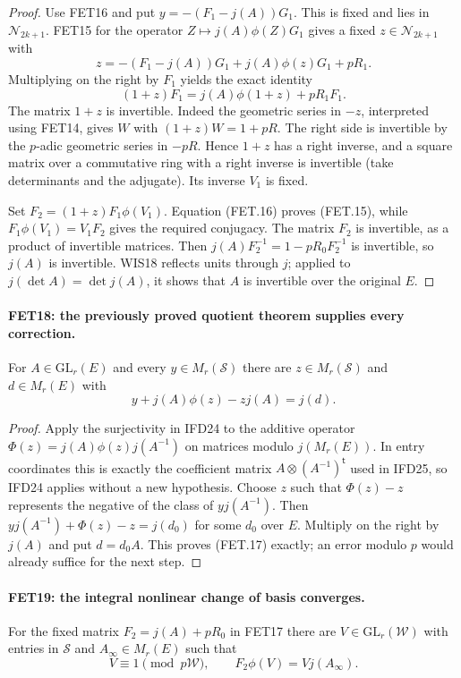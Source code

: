 \begin{proof}
Use FET16 and put $y=-(F_1-j(A))G_1$.
This is fixed and lies in $\mathcal N_{2k+1}$.
FET15 for the operator $Z\mapsto j(A)\phi(Z)G_1$ gives a
fixed $z\in\mathcal N_{2k+1}$ with
\[
 z=-(F_1-j(A))G_1+j(A)\phi(z)G_1+pR_1.
\]
Multiplying on the right by $F_1$ yields the exact identity
\[
 (1+z)F_1=j(A)\phi(1+z)+pR_1F_1.                           \tag{FET.16}
\]
The matrix $1+z$ is invertible. Indeed the geometric series
in $-z$, interpreted using FET14, gives $W$ with
$(1+z)W=1+pR$. The right side is invertible by the $p$-adic
geometric series in $-pR$. Hence $1+z$ has a right inverse,
and a square matrix over a commutative ring with a right inverse
is invertible (take determinants and the adjugate). Its inverse
$V_1$ is fixed.

Set $F_2=(1+z)F_1\phi(V_1)$. Equation (FET.16) proves
(FET.15), while
$F_1\phi(V_1)=V_1F_2$ gives the required conjugacy.
The matrix $F_2$ is invertible, as a product of invertible
matrices. Then
$j(A)F_2^{-1}=1-pR_0F_2^{-1}$ is invertible, so $j(A)$ is
invertible. WIS18 reflects units through $j$; applied to
$j(\det A)=\det j(A)$, it shows that $A$ is invertible over
the original $E$.
\end{proof}

\paragraph{FET18: the previously proved quotient theorem supplies every correction.}
\label{claim:FET18}
For $A\in\mathrm{GL}_r(E)$ and every $y\in M_r(\mathcal S)$
there are $z\in M_r(\mathcal S)$ and $d\in M_r(E)$ with
\[
                        y+j(A)\phi(z)-zj(A)=j(d).          \tag{FET.17}
\]

\begin{proof}
Apply the surjectivity in IFD24 to the additive operator
$\Phi(z)=j(A)\phi(z)j(A^{-1})$ on matrices modulo $j(M_r(E))$.
In entry coordinates this is exactly the coefficient matrix
$A\otimes(A^{-1})^{\mathsf t}$ used in IFD25, so IFD24
applies without a new hypothesis. Choose $z$ such that
$\Phi(z)-z$ represents the negative of the class of
$yj(A^{-1})$. Then
$yj(A^{-1})+\Phi(z)-z=j(d_0)$ for some $d_0$ over $E$.
Multiply on the right by $j(A)$ and put $d=d_0A$.
This proves (FET.17) exactly; an error modulo $p$ would already
suffice for the next step.
\end{proof}

\paragraph{FET19: the integral nonlinear change of basis converges.}
\label{claim:FET19}
For the fixed matrix $F_2=j(A)+pR_0$ in FET17 there are
$V\in\mathrm{GL}_r(\mathcal W)$ with entries in $\mathcal S$
and $A_\infty\in M_r(E)$ such that
\[
 V\equiv1\pmod {p\mathcal W},\qquad
                   F_2\phi(V)=Vj(A_\infty).               \tag{FET.18}
\]

